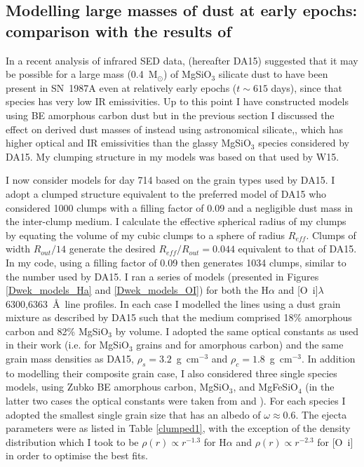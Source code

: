 \subsection{Modelling large masses of dust at early epochs: comparison 
with the results of \citet{Dwek2015}}
\label{dwek}

In a recent analysis of infrared SED data, \citet{Dwek2015} (hereafter 
DA15) suggested that it may be possible for a large mass (0.4~M$_\odot$) of 
MgSiO$_3$ silicate dust to have been present in SN~1987A even at 
relatively early epochs ($t\sim615$ days), since that species has very low 
IR emissivities.  Up to this point I have constructed models using 
\citet{Zubko1996} BE amorphous carbon dust but in the previous section I 
discussed the effect on derived dust masses of instead using 
\citet{Draine1984} astronomical silicate,, which has higher optical and IR 
emissivities than the glassy MgSiO$_3$ species considered by DA15. My 
clumping structure in my models was based on that used by W15.

I now consider models for day 714 based on the grain types
used by DA15.  I adopt a clumped structure equivalent to the 
preferred model of DA15 who considered 1000 clumps with a filling factor of 
0.09 and a negligible dust mass in the inter-clump medium.  I calculate 
the effective spherical radius of my clumps by equating the volume of my 
cubic clumps to a sphere of radius $R_{eff}$.  Clumps of width 
$R_{out}/14$ generate the desired $R_{eff}/R_{out}=0.044$ equivalent to 
that of DA15.  In my code, using a filling factor of 0.09 then generates 
1034 clumps, similar to the number used by DA15.  I ran a series of models 
(presented in Figures \ref{Dwek_models_Ha} and \ref{Dwek_models_OI}) for 
both the H$\alpha$ and [O~{\sc i}]$\lambda$6300,6363~\AA\ line profiles.  
In each case I modelled the lines using a dust grain mixture as described 
by DA15 such that the medium comprised 18\% amorphous carbon and 82\% 
MgSiO$_3$ by volume.  I adopted the same optical constants as used in 
their work (i.e. \citet{Jager2003} for MgSiO$_3$ grains and 
\citet{Zubko1996} for amorphous carbon) and the same grain mass densities as DA15, 
$\rho_s=3.2$~g~cm$^{-3}$ and $\rho_c=1.8$~g~cm$^{-3}$.  In addition to 
modelling their composite grain case, I also considered three single 
species models, using Zubko BE amorphous carbon, MgSiO$_3$, and 
MgFeSiO$_4$ (in the latter two cases the optical constants were taken from 
\citet{Jager1994} and \citet{Dorschner1995}). For each species I 
adopted the smallest single grain size that has an albedo of $\omega 
\approx 0.6$. The ejecta 
parameters were as listed in Table \ref{clumped1}, with the exception of 
the density distribution which I took to be $\rho(r) \propto r^{-1.3}$ 
for H$\alpha$ and $\rho(r) \propto r^{-2.3}$ for [O~{\sc i}] in order to 
optimise the best fits.

